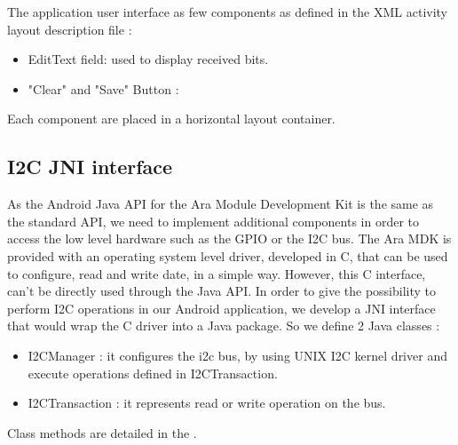 The application user interface as few components as defined in the XML activity layout description file :
\begin{itemize}
\item EditText field: used to display received bits.
\item "Clear" and "Save" Button :
\end{itemize}

Each component are placed in a horizontal layout container.

\subsection{I2C JNI interface}

As the Android Java API for the Ara Module Development Kit is the same as the standard API, we need to implement additional components in order to access the low level hardware such as the GPIO or the I2C bus.
The Ara MDK is provided with an operating system level driver, developed in C, that can be used to configure, read and write date, in a simple way.
However, this C interface, can't be directly used through the Java API. In order to give the possibility to perform I2C operations in our Android application, we develop a JNI interface that would wrap the C driver into a Java package.
So we define 2 Java classes : 
\begin{itemize}
\item I2CManager : it configures the i2c bus, by using UNIX I2C kernel driver and execute operations defined in I2CTransaction.
\item I2CTransaction : it represents read or write operation on the bus.
\end{itemize}

Class methods are detailed in the \citep{an:e}.
